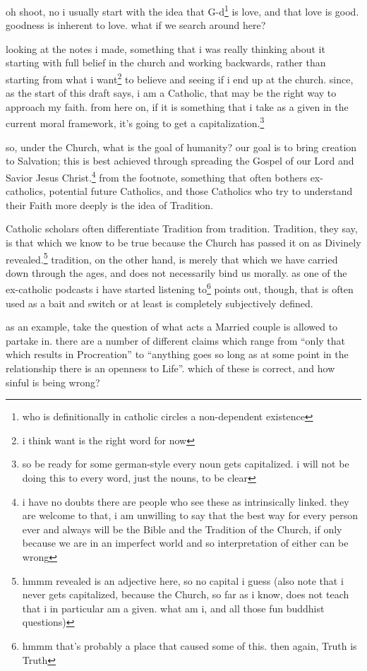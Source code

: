 \documentclass[12pt]{article}
\newcommand{\say}[1]{``#1''}
\renewcommand{\,}{\textsuperscript{,}}
\begin{document}
oh shoot, no i usually start with the idea that G-d\footnote{who is definitionally in catholic circles a non-dependent existence} is love, and that love is good.  
goodness is inherent to love.  
what if we search around here?

looking at the notes i made, something that i was really thinking about it starting with full belief in the church and working backwards, rather than starting from what i want\footnote{i think want is the right word for now} to believe and seeing if i end up at the church.  
since, as the start of this draft says, i am a Catholic, that may be the right way to approach my faith.  
from here on, if it is something that i take as a given in the current moral framework, it's going to get a capitalization.\footnote{so be ready for some german-style every noun gets capitalized. i will not be doing this to every word, just the nouns, to be clear}

so, under the Church, what is the goal of humanity?  
our goal is to bring creation to Salvation; this is best achieved through spreading the Gospel of our Lord and Savior Jesus Christ.\footnote{i have no doubts there are people who see these as intrinsically linked. they are welcome to that, i am unwilling to say that the best way for every person ever and always will be the Bible and the Tradition of the Church, if only because we are in an imperfect world and so interpretation of either can be wrong}  
from the footnote, something that often bothers ex-catholics, potential future Catholics, and those Catholics who try to understand their Faith more deeply is the idea of Tradition.

Catholic scholars often differentiate Tradition from tradition. Tradition, they say, is that which we know to be true because the Church has passed it on as Divinely revealed.\footnote{hmmm revealed is an adjective here, so no capital i guess (also note that i never gets capitalized, because the Church, so far as i know, does not teach that i in particular am a given. what am i, and all those fun buddhist questions)}  
tradition, on the other hand, is merely that which we have carried down through the ages, and does not necessarily bind us morally.  
as one of the ex-catholic podcasts i have started listening to\footnote{hmmm that's probably a place that caused some of this. then again, Truth is Truth} points out, though, that is often used as a bait and switch or at least is completely subjectively defined.

as an example, take the question of what acts a Married couple is allowed to partake in.  
there are a number of different claims which range from \say{only that which results in Procreation} to \say{anything goes so long as at some point in the relationship there is an openness to Life}.  
which of these is correct, and how sinful is being wrong?
\end{document}
